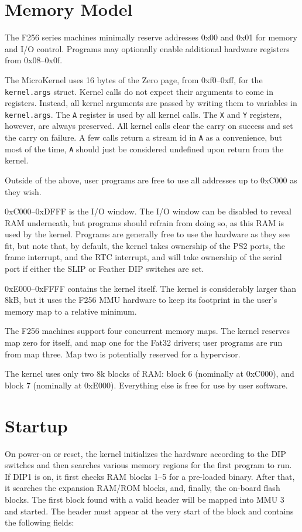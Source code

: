\section*{Memory Model}
The F256 series machines minimally reserve addresses 0x00 and 0x01 for memory and I/O control.  Programs may optionally enable additional hardware registers from 0x08--0x0f.

The MicroKernel uses 16 bytes of the Zero page, from 0xf0--0xff, for the \verb+kernel.args+ struct.  Kernel calls do not expect their arguments to come in registers.  Instead, all kernel arguments are passed by writing them to variables in \verb+kernel.args+.  The \verb+A+ register is used by all kernel calls.  The \verb+X+ and \verb+Y+ registers, however, are always preserved.  All kernel calls clear the carry on success and set the carry on failure.  A few calls return a stream id in \verb+A+ as a convenience, but most of the time, \verb+A+ should just be considered undefined upon return from the kernel.

Outside of the above, user programs are free to use all addresses up to 0xC000 as they wish.

0xC000--0xDFFF is the I/O window.  The I/O window can be disabled to reveal RAM underneath, but programs should refrain from doing so, as this RAM is used by the kernel.  Programs are generally free to use the hardware as they see fit, but note that, by default, the kernel takes ownership of the PS2 ports, the frame interrupt, and the RTC interrupt, and will take ownership of the serial port if either the SLIP or Feather DIP switches are set.

0xE000--0xFFFF contains the kernel itself.  The kernel is considerably larger than 8kB, but it uses the F256 MMU hardware to keep its footprint in the user's memory map to a relative minimum.

The F256 machines support four concurrent memory maps.  The kernel reserves map zero for itself, and map one for the Fat32 drivers; user programs are run from map three.  Map two is potentially reserved for a hypervisor. 

The kernel uses only two 8k blocks of RAM: block 6 (nominally at 0xC000), and block 7 (nominally at 0xE000).  Everything else is free for use by user software.

\section*{Startup}
On power-on or reset, the kernel initializes the hardware according to the DIP switches and then searches various memory regions for the first program to run.  If DIP1 is on, it first checks RAM blocks 1--5 for a pre-loaded binary.  After that, it searches the expansion RAM/ROM blocks, and, finally, the on-board flash blocks. The first block found with a valid header will be mapped into MMU 3 and started.  The header must appear at the very start of the block and contains the following fields:

